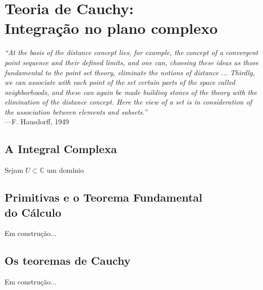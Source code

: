 \chapter[Teoria de Cauchy]{Teoria de Cauchy:\\ Integração no plano complexo}
\chaptermark{}


\hfill%
\begin{minipage}{12cm}
	\begin{flushright}
		\rightskip=0.5cm
		\textit{``At the basis of the distance concept lies, for example, 
		the concept of a convergent point sequence and their defined limits,
		and one can, choosing these ideas as those fundamental to the point 
		set theory, eliminate the notions of distance ... Thirdly, 
		we can associate with each point of the set certain parts of the space
		called neighborhoods, and these can again be made building stones of the 
		theory with the elimination of the distance concept. Here the view
		of a set is in consideration of the association between elements and
		subsets.''}
		\\[0.1cm]
		\rightskip=0.5cm
		---F. Hausdorff, 1949
	\end{flushright}
\end{minipage}



\section{A Integral Complexa}

\begin{lema}
Sejam $U \subset \mathbb{C}$ um domínio
\end{lema}




\section[Primitivas e o Teorema Fundamental do Cálculo]
{Primitivas e o Teorema Fundamental\\ do Cálculo}
\begin{center}
Em construção...
\end{center}


\section[Os teoremas de Cauchy]{Os teoremas de Cauchy}
\begin{center}
Em construção...
\end{center}